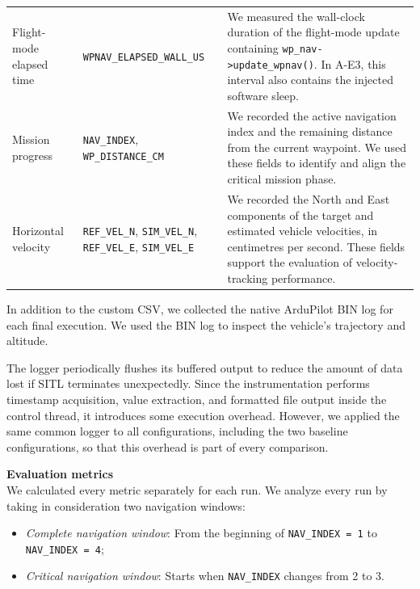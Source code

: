 \begin{table}[t]
\begin{tabular}{
        p{}
        p{}
        p{}}
        Flight-mode elapsed time &
        \texttt{WPNAV\_ELAPSED\_WALL\_US} &
        We measured the wall-clock duration of the flight-mode update
        containing \texttt{wp\_nav->update\_wpnav()}. In A-E3, this
        interval also contains the injected software sleep. \\

        Mission progress &
        \texttt{NAV\_INDEX},
        \texttt{WP\_DISTANCE\_CM} &
        We recorded the active navigation index and the remaining
        distance from the current waypoint. We used these fields to
        identify and align the critical mission phase. \\

        Horizontal velocity &
        \texttt{REF\_VEL\_N},
        \texttt{SIM\_VEL\_N},
        \texttt{REF\_VEL\_E},
        \texttt{SIM\_VEL\_E} &
        We recorded the North and East components of the target and
        estimated vehicle velocities, in centimetres per second.
        These fields support the evaluation of velocity-tracking
        performance. \\
        \bottomrule
    \end{tabular}
\end{table}

\noindent In addition to the custom CSV, we collected the native ArduPilot BIN log for each final execution. We used the BIN log to inspect the vehicle's trajectory and altitude.

\noindent The logger periodically flushes its buffered output to reduce the amount of data lost if SITL terminates unexpectedly. Since the instrumentation performs timestamp acquisition, value extraction, and formatted file output inside the control thread, it introduces some execution overhead. However, we applied the same common logger to all configurations, including the two baseline configurations, so that this overhead is part of every comparison.

\noindent \textbf{Evaluation metrics} \\
\noindent We calculated every metric separately for each run. We analyze every run by taking in consideration two navigation windows:
\begin{itemize}[nosep]
    \item \textit{Complete navigation window}: From the beginning of \texttt{NAV\_INDEX = 1} to \texttt{NAV\_INDEX = 4};
    \item \textit{Critical navigation window}: Starts when \texttt{NAV\_INDEX} changes from 2 to 3.
\end{itemize}

